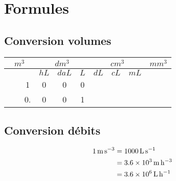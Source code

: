 \chapter{Formules}



\section{Conversion volumes}
\begin{table}[h!]
    \centering
    \begin{tabular}{|c|c|c|c|c|c|c|c|c|c|c|c|}
        \hline
        \multicolumn{3}{|c|}{\textbf{$m^3$}} & \multicolumn{3}{|c|}{\textbf{$dm^3$}} & \multicolumn{3}{|c|}{\textbf{$cm^3$}} & \multicolumn{3}{|c|}{\textbf{$mm^3$}} \\
        \hline
         & &                                 & $hL$ & $daL$ & $L$                    & $dL$ & $cL$ & $mL$                    & & & \\
        \hline \hline
         & &                               1 & 0    &   0   & 0                      & & &                                   & & & \\  
        \hline
         & &                               0. & 0    &   0   & 1                     & & &                                   & & & \\
        \hline
    \end{tabular}
\end{table}

\section{Conversion débits}
\begin{align*}
    \qty{1}{\metre\cubic\per\second} &= \qty{1000}{\litre\per\second}   \\
           &= \qty{3.6e3}{\metre\cubic\per\hour} \\
           &= \qty{3.6e6}{\litre\per\hour} \\
\end{align*}


